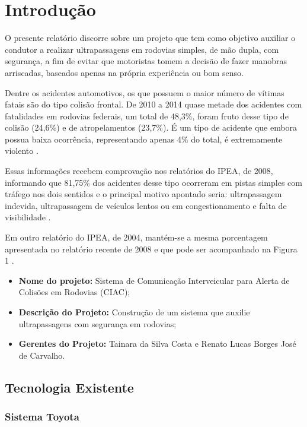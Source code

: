 \chapter{Introdução}

O presente relatório discorre sobre um projeto que tem como objetivo auxiliar o condutor a realizar ultrapassagens em rodovias simples, de mão dupla, com segurança, a fim de evitar que motoristas tomem a decisão de fazer manobras arriscadas, baseados apenas na própria experiência ou bom senso.

Dentre os acidentes automotivos, os que possuem o maior número de vítimas fatais são do tipo colisão frontal. De 2010 a 2014 quase metade dos acidentes com fatalidades em rodovias federais, um total de 48,3\%, foram fruto desse tipo de colisão (24,6\%) e de atropelamentos (23,7\%). É um tipo de acidente que embora possua baixa ocorrência, representando apenas 4\% do total, é extremamente violento \cite{ipea}.

Essas informações recebem comprovação nos relatórios do IPEA, de 2008, informando que 81,75\% dos acidentes desse tipo ocorreram em pistas simples com tráfego nos dois sentidos e o principal motivo apontado seria: ultrapassagem indevida, ultrapassagem de veículos lentos ou em congestionamento e falta de visibilidade \cite{fatoresCondicionantesGravidade}.

Em outro relatório do IPEA, de 2004, mantém-se a mesma porcentagem apresentada no relatório recente de 2008 e que pode ser acompanhado na Figura 1 \cite{brasilTemMaisVitimasDeTransito}.

\begin{itemize}
	\item \textbf{Nome do projeto:} Sistema de Comunicação Interveicular para Alerta de Colisões em Rodovias (CIAC);

	\item \textbf{Descrição do Projeto:} Construção de um sistema que auxilie ultrapassagens com segurança em rodovias;

	\item \textbf{Gerentes do Projeto:} Tainara da Silva Costa e Renato Lucas Borges José de Carvalho.
\end{itemize}

\section{Tecnologia Existente}

\subsection{Sistema Toyota}

